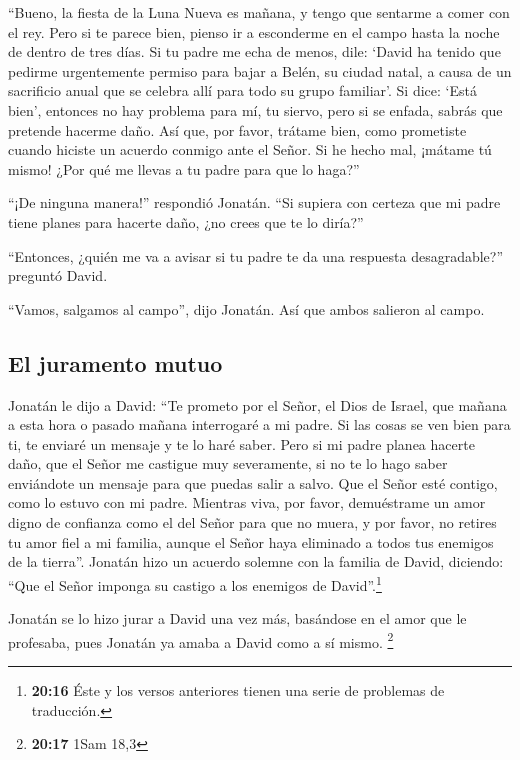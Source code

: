  ``Bueno, la fiesta de la Luna Nueva es mañana, y tengo
que sentarme a comer con el rey. Pero si te parece bien, pienso ir a
esconderme en el campo hasta la noche de dentro de tres días.
 Si tu padre me echa de menos, dile: `David ha tenido que
pedirme urgentemente permiso para bajar a Belén, su ciudad natal, a
causa de un sacrificio anual que se celebra allí para todo su grupo
familiar'.  Si dice: `Está bien', entonces no hay problema
para mí, tu siervo, pero si se enfada, sabrás que pretende hacerme daño.
 Así que, por favor, trátame bien, como prometiste cuando
hiciste un acuerdo conmigo ante el Señor. Si he hecho mal, ¡mátame tú
mismo! ¿Por qué me llevas a tu padre para que lo haga?''

 ``¡De ninguna manera!'' respondió Jonatán. ``Si supiera
con certeza que mi padre tiene planes para hacerte daño, ¿no crees que
te lo diría?''

 ``Entonces, ¿quién me va a avisar si tu padre te da una
respuesta desagradable?'' preguntó David.

 ``Vamos, salgamos al campo'', dijo Jonatán. Así que
ambos salieron al campo.

\hypertarget{el-juramento-mutuo}{%
\subsection{El juramento mutuo}\label{el-juramento-mutuo}}

 Jonatán le dijo a David: ``Te prometo por el Señor, el
Dios de Israel, que mañana a esta hora o pasado mañana interrogaré a mi
padre. Si las cosas se ven bien para ti, te enviaré un mensaje y te lo
haré saber.  Pero si mi padre planea hacerte daño, que el
Señor me castigue muy severamente, si no te lo hago saber enviándote un
mensaje para que puedas salir a salvo. Que el Señor esté contigo, como
lo estuvo con mi padre.  Mientras viva, por favor,
demuéstrame un amor digno de confianza como el del Señor para que no
muera,  y por favor, no retires tu amor fiel a mi
familia, aunque el Señor haya eliminado a todos tus enemigos de la
tierra''.  Jonatán hizo un acuerdo solemne con la familia
de David, diciendo: ``Que el Señor imponga su castigo a los enemigos de
David''.\footnote{\textbf{20:16} Éste y los versos anteriores tienen una
  serie de problemas de traducción.}

 Jonatán se lo hizo jurar a David una vez más, basándose
en el amor que le profesaba, pues Jonatán ya amaba a David como a sí
mismo. \footnote{\textbf{20:17} 1Sam 18,3}

